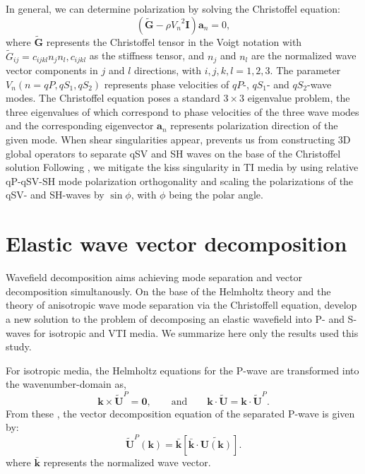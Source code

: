 In general, we can determine polarization  by solving the Christoffel equation:
\begin{equation}
\label{eq:christoffel}
(\widetilde{\mathbf{G}}-\rho{V_{n}}^2\mathbf{I})\mathbf{a}_{n}=0,
\end{equation}
where $\widetilde{\mathbf{G}}$ represents the Christoffel tensor in the Voigt notation with $\widetilde{G}_{ij}=c_{ijkl}n_{j}n_{l},
 c_{ijkl}$ as the stiffness tensor, and
$n_{j}$ and $n_{l}$ are the normalized wave vector components in $j$ and $l$ directions, with $i,j,k,l=1,2,3$. The
parameter $V_{n} (n=qP, qS_{1}, qS_{2})$ represents phase velocities of $qP$-, $qS_{1}$- and $qS_{2}$-wave modes. 
 The Christoffel equation poses a standard $3\times3$ eigenvalue problem, the three eigenvalues of which correspond to phase
velocities of the three wave modes and the corresponding eigenvector $\mathbf{a}_{n}$ represents polarization direction of the given mode.
When shear singularities appear,   prevents us from
constructing 3D global operators to separate qSV and SH waves on the base of the Christoffel solution
Following \cite {yan:2009,yan.sava:2011}, we mitigate the kiss singularity  in  TI media by using relative qP-qSV-SH mode 
polarization orthogonality and scaling the polarizations of the qSV- and SH-waves by $\sin{\phi}$,
 with $\phi$ being the polar angle.

\section{Elastic wave vector decomposition}
Wavefield decomposition aims achieving mode separation and vector decomposition simultanously.
On the base of the Helmholtz theory and the theory of anisotropic wave mode separation via the Christoffell equation,
\cite{zhang.mcmechan:2010} develop a new solution to the problem of decomposing an elastic wavefield into P- and S-waves for
isotropic and VTI media. We summarize here only the results used  this study.

For isotropic media, the Helmholtz equations for the P-wave are transformed into the wavenumber-domain as,
\begin{equation}
\label{eq:helmP1K}
\mathbf{k}\times\tilde{\mathbf{U}}^P = \mathbf{0}, \qquad \mbox{and} \qquad \mathbf{k}\cdot\tilde{\mathbf{U}} = \mathbf{k}\cdot\tilde{\mathbf{U}}^P.
\end{equation}
From these , the vector decomposition equation of the separated P-wave is given by:
\begin{equation}
\label{eq:decomPK}
\tilde{\mathbf{U}}^P(\mathbf{k}) = \bar{\mathbf{k}}[\bar{\mathbf{k}}\cdot\tilde{\mathbf{U}(\mathbf{k})}].
\end{equation}
where $\bar{\mathbf{k}}$ represents the normalized wave vector.

